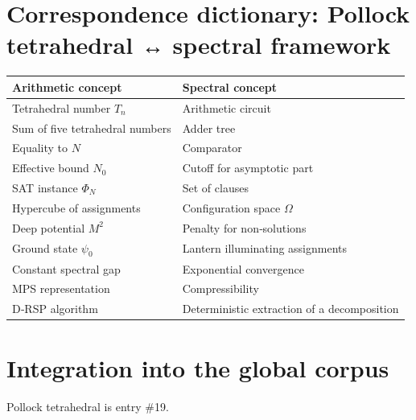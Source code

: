 \documentclass[11pt,a4paper]{article}
\begin{document}
\section{Correspondence dictionary: Pollock tetrahedral ↔ spectral framework}

\begin{center}
\small
\begin{tabular}{@{}l|l@{}}
\toprule
\textbf{Arithmetic concept} & \textbf{Spectral concept} \\
\midrule
Tetrahedral number $T_n$ & Arithmetic circuit \\
Sum of five tetrahedral numbers & Adder tree \\
Equality to $N$ & Comparator \\
Effective bound $N_0$ & Cutoff for asymptotic part \\
SAT instance $\Phi_N$ & Set of clauses \\
Hypercube of assignments & Configuration space $\Omega$ \\
Deep potential $M^2$ & Penalty for non‑solutions \\
Ground state $\psi_0$ & Lantern illuminating assignments \\
Constant spectral gap & Exponential convergence \\
MPS representation & Compressibility \\
D‑RSP algorithm & Deterministic extraction of a decomposition \\
\bottomrule
\end{tabular}
\end{center}

\section{Integration into the global corpus}

Pollock tetrahedral is entry \#19.
\end{document}
